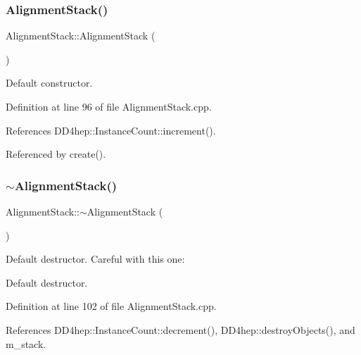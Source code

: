 \subsubsection{\texorpdfstring{Alignment\+Stack()}{AlignmentStack()}}
{\footnotesize\ttfamily Alignment\+Stack\+::\+Alignment\+Stack (\begin{DoxyParamCaption}{ }\end{DoxyParamCaption})\hspace{0.3cm}{\ttfamily [protected]}}



Default constructor. 



Definition at line 96 of file Alignment\+Stack.\+cpp.



References D\+D4hep\+::\+Instance\+Count\+::increment().



Referenced by create().

\hypertarget{class_d_d4hep_1_1_alignments_1_1_alignment_stack_aaa0a50b4ba221d1591a3cdadbc06153c}{}\label{class_d_d4hep_1_1_alignments_1_1_alignment_stack_aaa0a50b4ba221d1591a3cdadbc06153c} 
\subsubsection{\texorpdfstring{$\sim$\+Alignment\+Stack()}{~AlignmentStack()}}
{\footnotesize\ttfamily Alignment\+Stack\+::$\sim$\+Alignment\+Stack (\begin{DoxyParamCaption}{ }\end{DoxyParamCaption})\hspace{0.3cm}{\ttfamily [virtual]}}



Default destructor. Careful with this one\+: 

Default destructor. 

Definition at line 102 of file Alignment\+Stack.\+cpp.



References D\+D4hep\+::\+Instance\+Count\+::decrement(), D\+D4hep\+::destroy\+Objects(), and m\+\_\+stack.



